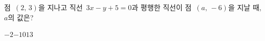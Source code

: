 점~$(2,\,3)$을 지나고 직선~$3x-y+5=0$과 평행한 직선이 점~$(a,\,-6)$을 지날 때, $a$의 값은?
\begin{choices32}{$-2$}{$-1$}{$0$}{$1$}{$3$}\end{choices32}
